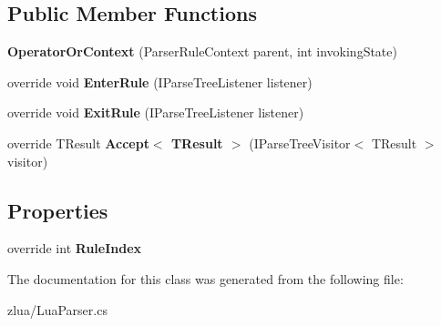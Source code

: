 \subsection*{Public Member Functions}
\begin{DoxyCompactItemize}
\item 
\mbox{\label{classzlua_1_1_lua_parser_1_1_operator_or_context_a622c6a5d370bb5d2e38ebb362574ebe5}} 
{\bfseries Operator\+Or\+Context} (Parser\+Rule\+Context parent, int invoking\+State)
\item 
\mbox{\label{classzlua_1_1_lua_parser_1_1_operator_or_context_a4090fbf0a6c74e162f1ca851c662c0c4}} 
override void {\bfseries Enter\+Rule} (I\+Parse\+Tree\+Listener listener)
\item 
\mbox{\label{classzlua_1_1_lua_parser_1_1_operator_or_context_a3ae34caae6cb97cfe2b21592c41148a0}} 
override void {\bfseries Exit\+Rule} (I\+Parse\+Tree\+Listener listener)
\item 
\mbox{\label{classzlua_1_1_lua_parser_1_1_operator_or_context_a6a7e050c445c588672dbf6219addceb1}} 
override T\+Result {\bfseries Accept$<$ T\+Result $>$} (I\+Parse\+Tree\+Visitor$<$ T\+Result $>$ visitor)
\end{DoxyCompactItemize}
\subsection*{Properties}
\begin{DoxyCompactItemize}
\item 
\mbox{\label{classzlua_1_1_lua_parser_1_1_operator_or_context_a52863538ee7cc177f221b265df38cbbf}} 
override int {\bfseries Rule\+Index}
\end{DoxyCompactItemize}


The documentation for this class was generated from the following file\+:\begin{DoxyCompactItemize}
\item 
zlua/Lua\+Parser.\+cs\end{DoxyCompactItemize}
